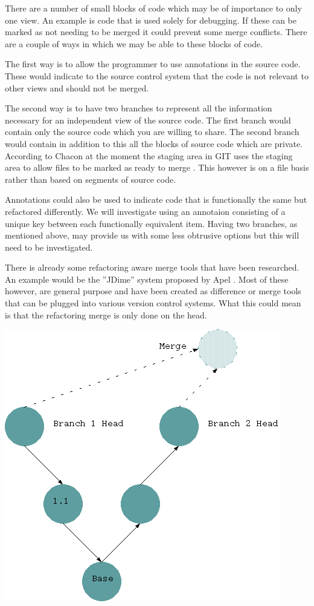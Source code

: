 \documentclass[12pt]{CRPITStyle}
\renewcommand{\cite}{\citep}
\begin{document}
There are a number of small blocks of code which may be of importance to only one view.  An example is code that is used solely for debugging. If these can be marked as not needing to be merged it could prevent some merge conflicts. There are a couple of ways in which we may be able to these blocks of code.

The first way is to allow the programmer to use annotations in the source code.  These would indicate to the source control system that the code is not relevant to other views and should not be merged.

The second way is to have two branches to represent all the information necessary for an independent view of the source code.  The first branch would contain only the source code which you are willing to share. The second branch would contain in addition to this all the blocks of source code which are private.  According to Chacon at the moment the staging area in GIT uses the staging area to allow files to be marked as ready to merge \cite{Chacon2009}. This however is on a file basis rather than based on segments of source code.

Annotations could also be used to indicate code that is functionally the same but refactored differently. We will investigate using an annotaion consisting of a unique key between each functionally equivalent item. Having two branches, as mentioned above, may provide us with some less obtrusive options but this will need to be investigated.

There is already some refactoring aware merge tools that have been researched. An example would be the ''JDime'' system proposed by Apel \cite{Apel2011}. Most of these however, are general purpose and have been created as difference or merge tools that can be plugged into various version control systems. What this could mean is that the refactoring merge is only done on the head.

\begin{center}
\includegraphics[scale=0.5]{git-diag2}
\end{center}
\end{document}
